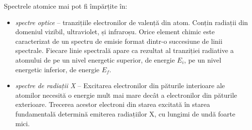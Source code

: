 Spectrele atomice mai pot fi împărțite în:
\begin{itemize}
    \item \emph{spectre optice} -- tranzițiile electronilor de valență din
        atom. Conțin radiații din domeniul vizibil, ultraviolet, și infraroșu.
        Orice element chimic este caracterizat de un spectru de emisie format
        dintr-o succesiune de linii spectrale. Fiecare linie spectrală apare ca
        rezultat al tranziției radiative a atomului de pe un nivel energetic
        superior, de energie $E_i$, pe un nivel energetic inferior, de energie
        $E_f$.
    \item \emph{spectre de radiații X} -- Excitarea electronilor din păturile
        interioare ale atomilor necesită o energie mult mai mare decât a electronilor din păturile exterioare. Trecerea acestor electroni din starea excitată în starea fundamentală determină emiterea radiațiilor X, cu lungimi de undă foarte mici.
\end{itemize}
